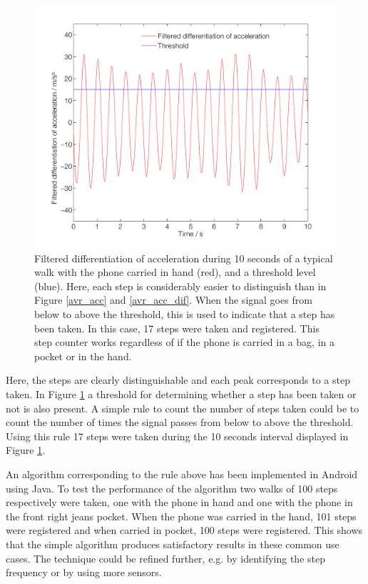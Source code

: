 \documentclass{LTHthesis}
\begin{document}
\begin{figure}[!hbt]

\includegraphics[width=1\textwidth ]{images/kinematic/avr_acc_dif_filt}
\caption{Filtered differentiation of acceleration during 10 seconds of a typical walk with the phone carried in hand (red), and a threshold level (blue). Here, each step is considerably easier to distinguish than in Figure \ref{avr_acc} and \ref{avr_acc_dif}. When the signal goes from below to above the threshold, this is used to indicate that a step has been taken. In this case, 17 steps were taken and registered. This step counter works regardless of if the phone is carried in a bag, in a pocket or in the hand.}\label{avr_acc_dif_filt}
\end{figure}

Here, the steps are clearly distinguishable and each peak corresponds to a step taken. In Figure \ref{avr_acc_dif_filt} a threshold for determining whether a step has been taken or not is also present. A simple rule to count the number of steps taken could be to count the number of times the signal passes from below to above the threshold. Using this rule 17 steps were taken during the 10 seconds interval displayed in Figure \ref{avr_acc_dif_filt}.

An algorithm corresponding to the rule above has been implemented in Android using Java. To test the performance of the algorithm two walks of 100 steps respectively were taken, one with the phone in hand and one with the phone in the front right jeans pocket. When the phone was carried in the hand, 101 steps were registered and when carried in pocket, 
100 steps were registered. This shows that the simple algorithm produces satisfactory results in these common use cases.
The technique could be refined further, e.g. by identifying the step frequency or by using more sensors. 
%
\end{document}
